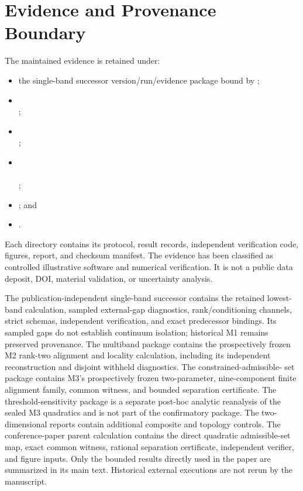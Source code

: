 \section{Evidence and Provenance Boundary}
\label{app:evidence-provenance}

The maintained evidence is retained under:
\begin{itemize}
 \item the single-band successor version/run/evidence package bound by
       ;
 \item {}\\
       ;
 \item {}\\
       ;
 \item {}\\
       \\
       ;
 \item {}; and
 \item {}.
\end{itemize}
Each directory contains its protocol, result records, independent verification
code, figures, report, and checksum manifest. The evidence has been classified
as controlled illustrative software and numerical verification. It is not a
public data deposit, DOI, material validation, or uncertainty analysis.

The publication-independent single-band successor contains the retained lowest-band
calculation, sampled external-gap diagnostics, rank/conditioning channels, strict
schemas, independent verification, and exact predecessor bindings. Its sampled gaps
do not establish continuum isolation; historical M1 remains preserved provenance.
The multiband package contains the prospectively frozen
M2 rank-two alignment and locality calculation, including its independent
reconstruction and disjoint withheld diagnostics. The constrained-admissible-
set package contains M3's prospectively frozen two-parameter, nine-component
finite alignment family, common witness, and bounded separation certificate.
The threshold-sensitivity package is a separate post-hoc analytic reanalysis of
the sealed M3 quadratics and is not part of the confirmatory package. The
two-dimensional reports contain additional composite and topology controls.
The conference-paper parent calculation contains the direct quadratic
admissible-set map, exact common witness, rational separation certificate,
independent verifier, and figure inputs. Only the bounded results
directly used in the paper are summarized in its main text. Historical external
executions are not rerun by the manuscript.

